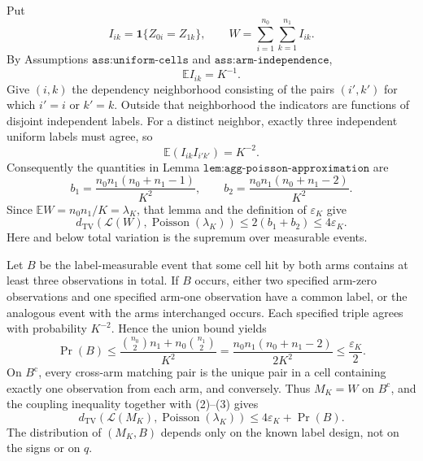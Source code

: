 Put
\[
 I_{ik}=\mathbf 1\{Z_{0i}=Z_{1k}\},
 \qquad
 W=\sum_{i=1}^{n_0}\sum_{k=1}^{n_1}I_{ik}.
\]
By Assumptions \(\texttt{ass:uniform-cells}\) and
\(\texttt{ass:arm-independence}\),
\[
 \mathbb E I_{ik}=K^{-1}.
 \tag{1}
\]
Give \((i,k)\) the dependency neighborhood consisting of the pairs
\((i',k')\) for which \(i'=i\) or \(k'=k\).  Outside that neighborhood
the indicators are functions of disjoint independent labels.  For a
distinct neighbor, exactly three independent uniform labels must agree,
so
\[
 \mathbb E(I_{ik}I_{i'k'})=K^{-2}.
\]
Consequently the quantities in
Lemma \(\texttt{lem:agg-poisson-approximation}\) are
\[
 b_1=\frac{n_0n_1(n_0+n_1-1)}{K^2},
 \qquad
 b_2=\frac{n_0n_1(n_0+n_1-2)}{K^2}.
\]
Since \(\mathbb EW=n_0n_1/K=\lambda_K\), that lemma and the definition of
\(\varepsilon_K\) give
\[
 d_{\mathrm{TV}}\!\left(\mathcal L(W),
       \operatorname{Poisson}(\lambda_K)\right)
 \le 2(b_1+b_2)
 \le 4\varepsilon_K.
 \tag{2}
\]
Here and below total variation is the supremum over measurable events.

Let \(B\) be the label-measurable event that some cell hit by both arms
contains at least three observations in total.  If \(B\) occurs, either
two specified arm-zero observations and one specified arm-one
observation have a common label, or the analogous event with the arms
interchanged occurs.  Each specified triple agrees with probability
\(K^{-2}\).  Hence the union bound yields
\[
 \Pr(B)
 \le
 \frac{\binom{n_0}{2}n_1+n_0\binom{n_1}{2}}{K^2}
 =
 \frac{n_0n_1(n_0+n_1-2)}{2K^2}
 \le \frac{\varepsilon_K}{2}.
 \tag{3}
\]
On \(B^{\mathrm c}\), every cross-arm matching pair is the unique pair in
a cell containing exactly one observation from each arm, and conversely.
Thus \(M_K=W\) on \(B^{\mathrm c}\), and the coupling inequality together
with (2)--(3) gives
\[
 d_{\mathrm{TV}}\!\left(\mathcal L(M_K),
       \operatorname{Poisson}(\lambda_K)\right)
 \le 4\varepsilon_K+\Pr(B).
 \tag{4}
\]
The distribution of \((M_K,B)\) depends only on the known label design,
not on the signs or on \(q\).

